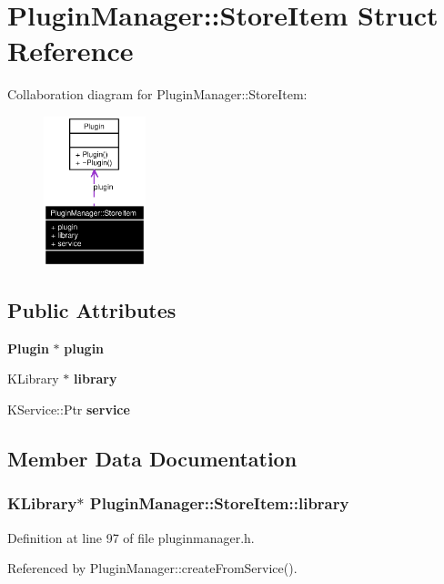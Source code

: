 \section{Plugin\-Manager::Store\-Item Struct Reference}
\label{structPluginManager_1_1StoreItem}
Collaboration diagram for Plugin\-Manager::Store\-Item:\begin{figure}[H]
\begin{center}
\leavevmode
\includegraphics[width=84pt]{structPluginManager_1_1StoreItem__coll__graph}
\end{center}
\end{figure}
\subsection*{Public Attributes}
\begin{CompactItemize}
\item 
{\bf Plugin} $\ast$ {\bf plugin}
\item 
KLibrary $\ast$ {\bf library}
\item 
KService::Ptr {\bf service}
\end{CompactItemize}


\subsection{Member Data Documentation}
\subsubsection{\setlength{\rightskip}{0pt plus 5cm}KLibrary$\ast$ {\bf Plugin\-Manager::Store\-Item::library}}\label{structPluginManager_1_1StoreItem_PluginManager_1_1StoreItemo1}




Definition at line 97 of file pluginmanager.h.

Referenced by Plugin\-Manager::create\-From\-Service().
